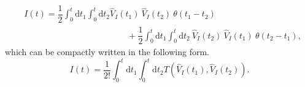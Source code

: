 \documentclass[
11pt, %
english, %
singlespacing, %
headsepline, %
]{MastersDoctoralThesis} %
\begin{document}
\begin{equation*}
\begin{split}
&I(t)=\dfrac{1}{2}
\int_{0}^{t}\mathrm{d}t_1\int_{0}^{t}\! \! \mathrm{d}t_2
\hat{V}_{I}(t_1)\ \hat{V}_{I}(t_2)\ \theta (t_1 -t_2)
\\
&\qquad\qquad\qquad\qquad\qquad\qquad
+
\dfrac{1}{2}
\int_{0}^{t}\mathrm{d}t_1\int_{0}^{t}\! \! \mathrm{d}t_2
\ \hat{V}_{I}(t_2)\  \hat{V}_{I}(t_1) \ \theta (t_2-t_1)
,
\end{split}
\end{equation*}
which can be compactly written in the following form.
\begin{equation}
I(t)=\dfrac{1}{2!}
\int_{0}^{t}\mathrm{d}t_1\int_{0}^{t}\! \! \mathrm{d}t_2
T(\hat{V}_{I}(t_1),\hat{V}_{I}(t_2))
.
\end{equation}
\end{document}
